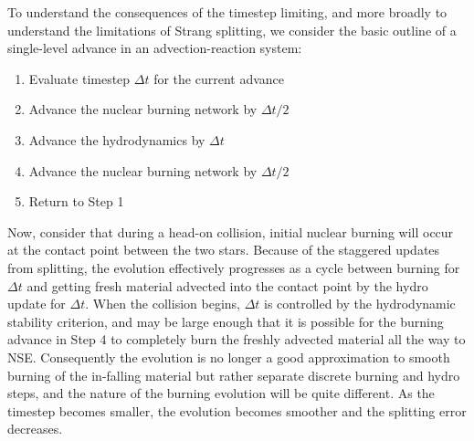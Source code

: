 \documentclass[twocolumn,numberedappendix]{../aastex62}
\begin{document}
To understand the consequences of the timestep limiting, and more broadly to 
understand the limitations of Strang splitting, we consider the 
basic outline of a single-level advance in an advection-reaction system:
\begin{enumerate}
  \item Evaluate timestep $\Delta t$ for the current advance
  \item Advance the nuclear burning network by $\Delta t / 2$
  \item Advance the hydrodynamics by $\Delta t$
  \item Advance the nuclear burning network by $\Delta t / 2$
  \item Return to Step 1
\end{enumerate}
Now, consider that during a head-on collision, initial nuclear burning 
will occur at the contact point between the two stars. Because of 
the staggered updates from splitting, the evolution effectively progresses 
as a cycle between burning for $\Delta t$ and getting fresh material 
advected into the contact point by the hydro update for $\Delta t$. 
When the collision begins, $\Delta t$ is controlled by the hydrodynamic 
stability criterion, and may be large enough that it is possible for 
the burning advance in Step 4 to completely burn the freshly advected 
material all the way to NSE. Consequently the evolution is no longer 
a good approximation to smooth burning of the in-falling material but
rather separate discrete burning and hydro steps, and the nature of 
the burning evolution will be quite different. As the timestep becomes
smaller, the evolution becomes smoother and the splitting error decreases.
\end{document}
